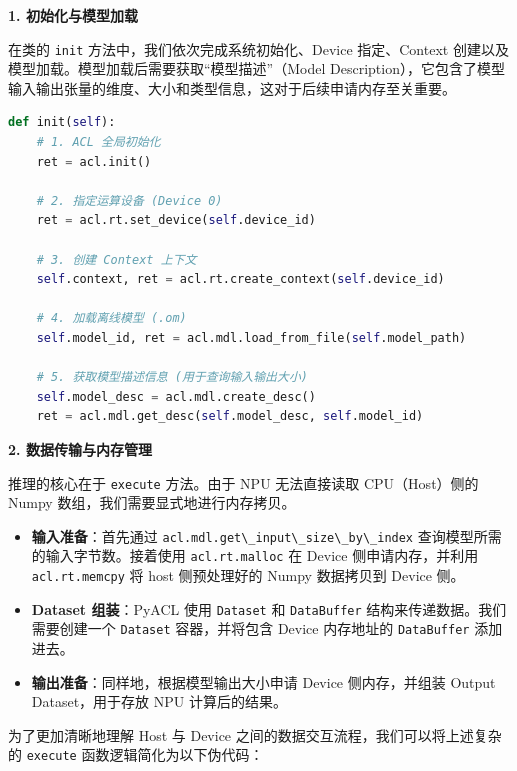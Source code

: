 \textbf{1. 初始化与模型加载}

在类的 \passthrough{\lstinline!init!}
方法中，我们依次完成系统初始化、Device 指定、Context
创建以及模型加载。模型加载后需要获取``模型描述''（Model
Description），它包含了模型输入输出张量的维度、大小和类型信息，这对于后续申请内存至关重要。

\begin{lstlisting}[language=Python]
def init(self):
    # 1. ACL 全局初始化
    ret = acl.init()
    
    # 2. 指定运算设备 (Device 0)
    ret = acl.rt.set_device(self.device_id)
    
    # 3. 创建 Context 上下文
    self.context, ret = acl.rt.create_context(self.device_id)
    
    # 4. 加载离线模型 (.om)
    self.model_id, ret = acl.mdl.load_from_file(self.model_path)
    
    # 5. 获取模型描述信息 (用于查询输入输出大小)
    self.model_desc = acl.mdl.create_desc()
    ret = acl.mdl.get_desc(self.model_desc, self.model_id)
\end{lstlisting}

\textbf{2. 数据传输与内存管理}

推理的核心在于 \passthrough{\lstinline!execute!} 方法。由于 NPU
无法直接读取 CPU（Host）侧的 Numpy 数组，我们需要显式地进行内存拷贝。

\begin{itemize}
\tightlist
\item
  \textbf{输入准备}：首先通过
  \passthrough{\lstinline!acl.mdl.get\_input\_size\_by\_index!}
  查询模型所需的输入字节数。接着使用
  \passthrough{\lstinline!acl.rt.malloc!} 在 Device 侧申请内存，并利用
  \passthrough{\lstinline!acl.rt.memcpy!} 将 host 侧预处理好的 Numpy
  数据拷贝到 Device 侧。
\item
  \textbf{Dataset 组装}：PyACL 使用 \passthrough{\lstinline!Dataset!} 和
  \passthrough{\lstinline!DataBuffer!} 结构来传递数据。我们需要创建一个
  \passthrough{\lstinline!Dataset!} 容器，并将包含 Device 内存地址的
  \passthrough{\lstinline!DataBuffer!} 添加进去。
\item
  \textbf{输出准备}：同样地，根据模型输出大小申请 Device 侧内存，并组装
  Output Dataset，用于存放 NPU 计算后的结果。
\end{itemize}

为了更加清晰地理解 Host 与 Device
之间的数据交互流程，我们可以将上述复杂的
\passthrough{\lstinline!execute!} 函数逻辑简化为以下伪代码：

